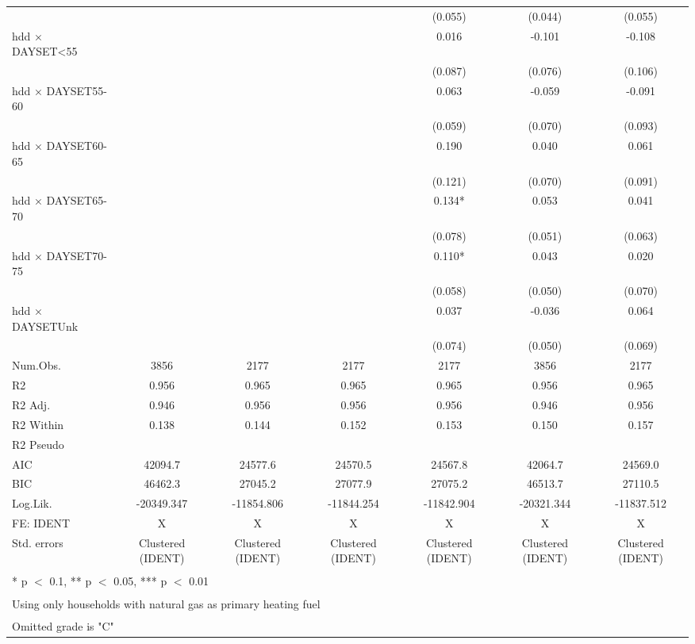\documentclass[
]{article}
\begin{document}
\begin{table}
{\begin{tabular}[t]{lcccccc}
 &  &  &  & (0.055) & (0.044) & (0.055)\\
hdd × DAYSET<55 &  &  &  & 0.016 & -0.101 & -0.108\\
 &  &  &  & (0.087) & (0.076) & (0.106)\\
hdd × DAYSET55-60 &  &  &  & 0.063 & -0.059 & -0.091\\
 &  &  &  & (0.059) & (0.070) & (0.093)\\
hdd × DAYSET60-65 &  &  &  & 0.190 & 0.040 & 0.061\\
 &  &  &  & (0.121) & (0.070) & (0.091)\\
hdd × DAYSET65-70 &  &  &  & 0.134* & 0.053 & 0.041\\
 &  &  &  & (0.078) & (0.051) & (0.063)\\
hdd × DAYSET70-75 &  &  &  & 0.110* & 0.043 & 0.020\\
 &  &  &  & (0.058) & (0.050) & (0.070)\\
hdd × DAYSETUnk &  &  &  & 0.037 & -0.036 & 0.064\\
 &  &  &  & (0.074) & (0.050) & (0.069)\\
\midrule
Num.Obs. & 3856 & 2177 & 2177 & 2177 & 3856 & 2177\\
R2 & 0.956 & 0.965 & 0.965 & 0.965 & 0.956 & 0.965\\
R2 Adj. & 0.946 & 0.956 & 0.956 & 0.956 & 0.946 & 0.956\\
R2 Within & 0.138 & 0.144 & 0.152 & 0.153 & 0.150 & 0.157\\
R2 Pseudo &  &  &  &  &  & \\
AIC & 42094.7 & 24577.6 & 24570.5 & 24567.8 & 42064.7 & 24569.0\\
BIC & 46462.3 & 27045.2 & 27077.9 & 27075.2 & 46513.7 & 27110.5\\
Log.Lik. & -20349.347 & -11854.806 & -11844.254 & -11842.904 & -20321.344 & -11837.512\\
FE: IDENT & X & X & X & X & X & X\\
Std. errors & Clustered (IDENT) & Clustered (IDENT) & Clustered (IDENT) & Clustered (IDENT) & Clustered (IDENT) & Clustered (IDENT)\\
\bottomrule
\multicolumn{7}{l}{\textsuperscript{} * p $<$ 0.1, ** p $<$ 0.05, *** p $<$ 0.01}\\
\multicolumn{7}{l}{\textsuperscript{} Using only households with natural gas as primary heating fuel}\\
\multicolumn{7}{l}{\textsuperscript{} Omitted grade is "C"}\\
\end{tabular}}
\end{table}
\end{document}
